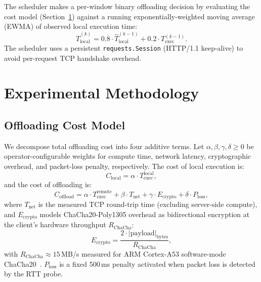 \documentclass[10pt,twocolumn]{article}
\begin{document}
The scheduler makes a per-window binary offloading decision by evaluating
the cost model (Section~\ref{sec:methodology}) against a running
exponentially-weighted moving average (EWMA) of observed local execution
time:
\begin{equation}
\hat{T}_{\text{local}}^{(k)} = 0.8 \cdot \hat{T}_{\text{local}}^{(k-1)}
                               + 0.2 \cdot T_{\text{exec}}^{(k-1)}.
\end{equation}
The scheduler uses a persistent \texttt{requests.Session} (HTTP/1.1
keep-alive) to avoid per-request TCP handshake overhead.

\section{Experimental Methodology}
\label{sec:methodology}

\subsection{Offloading Cost Model}

We decompose total offloading cost into four additive terms. Let
$\alpha, \beta, \gamma, \delta \geq 0$ be operator-configurable weights
for compute time, network latency, cryptographic overhead, and packet-loss
penalty, respectively.  The cost of local execution is:
\begin{equation}
C_{\text{local}} = \alpha \cdot T_{\text{exec}}^{\text{local}},
\end{equation}
and the cost of offloading is:
\begin{equation}
C_{\text{offload}} = \alpha \cdot T_{\text{exec}}^{\text{remote}}
    + \beta \cdot T_{\text{net}}
    + \gamma \cdot E_{\text{crypto}}
    + \delta \cdot P_{\text{loss}},
\label{eq:cost_offload}
\end{equation}
where $T_{\text{net}}$ is the measured TCP round-trip time (excluding
server-side compute), and $E_{\text{crypto}}$ models ChaCha20-Poly1305
overhead as bidirectional encryption at the client's
hardware throughput $R_{\text{ChaCha}}$:
\begin{equation}
E_{\text{crypto}} = \frac{2 \cdot |\text{payload}|_{\text{bytes}}}
    {R_{\text{ChaCha}}},
\label{eq:crypto}
\end{equation}
with $R_{\text{ChaCha}} \approx 15$\,MB/s measured for ARM
Cortex-A53 software-mode ChaCha20~\cite{mackey2020wg}.  $P_{\text{loss}}$ is
a fixed 500\,ms penalty activated when packet loss is detected by the RTT
probe.
\end{document}

